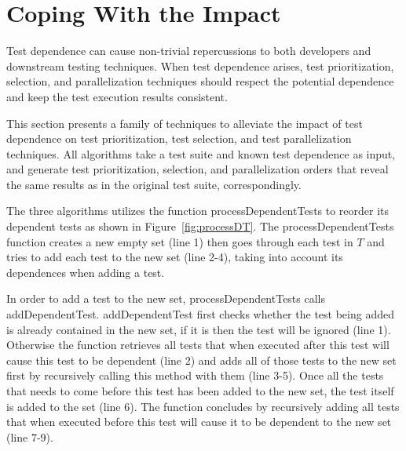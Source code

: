 \section{Coping With the Impact}
\label{sec:cope}

Test dependence can cause non-trivial repercussions
to both developers and downstream testing techniques.
When test dependence arises, test prioritization,
selection, and parallelization techniques
should respect the potential dependence and keep the
test execution results consistent.

This section presents a family of techniques to alleviate the
impact of test dependence on test prioritization, test
selection, and test parallelization techniques. All algorithms
take a test suite and known test dependence as input, and
generate test prioritization, selection, and parallelization orders
that reveal the same results as in the original
test suite, correspondingly.


The three algorithms utilizes the function processDependentTests
to reorder its dependent tests as shown in Figure~\ref{fig:processDT}.
The processDependentTests function creates a new empty set (line 1)
then goes through each test in $\mathit{T}$ and tries to add each
test to the new set (line 2-4), taking into account its dependences
when adding a test. 


In order to add a test to the new set, processDependentTests calls
addDependentTest. addDependentTest first checks whether the test
being added is already contained in the new set, if it is then the
test will be ignored (line 1). Otherwise the function retrieves all
tests that when executed after this test will cause this test to be
dependent (line 2) and adds all of those tests to the new set first
by recursively calling this method with them (line 3-5). Once all
the tests that needs to come before this test has been added to
the new set, the test itself is added to the set (line 6). The
function concludes by recursively adding all tests that when executed
before this test will cause it to be dependent to the new set (line 7-9).     





